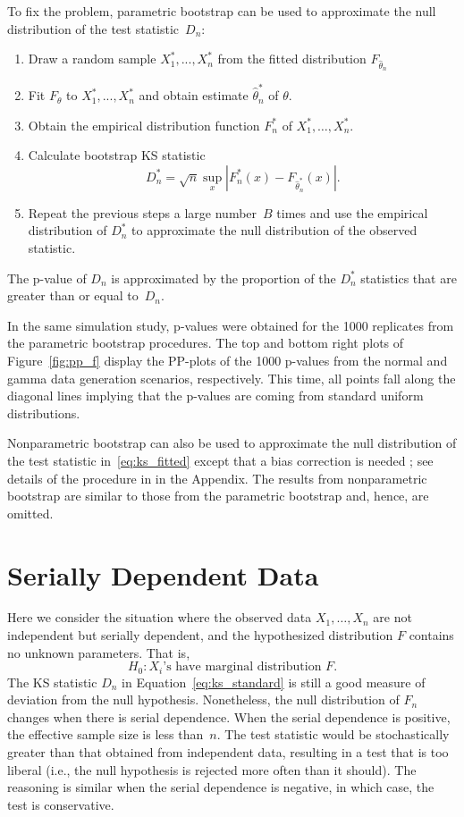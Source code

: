 \documentclass[12pt, letterpaper, titlepage]{article}
\begin{document}
To fix the problem, parametric bootstrap can be used to approximate the null
distribution of the test statistic~$D_n$:
\begin{enumerate}
\item
  Draw a random sample $X_1^*,...,X_n^*$ from the fitted distribution
  $F_{\hat\theta_n}$
\item
  Fit $F_\theta$ to $X_1^*,...,X_n^*$ and obtain estimate 
	$\hat\theta_n^*$ of $\theta$.
\item
  Obtain the empirical distribution function $F_n^*$ of
  $X_1^*, \ldots,  X_n^*$.
\item
  Calculate bootstrap KS statistic
  \[
    D_n^* = \sqrt{n} \sup_x | F_n^* (x)- F_{\hat\theta_n^*}(x) |.
  \]
\item
  Repeat the previous steps a large number~$B$ times and use the empirical
  distribution of $D_n^*$ to approximate the null distribution of the observed
  statistic.
\end{enumerate}
The p-value of $D_n$ is approximated by the proportion of the $D_n^*$ 
statistics that are greater than or equal to~$D_n$.


In the same simulation study, p-values were obtained for the 1000 replicates
from the parametric bootstrap procedures. The top and bottom right plots of 
Figure~\ref{fig:pp_f} display the PP-plots of the 1000
p-values from the normal and gamma data generation scenarios,
respectively. This time, all points fall along the diagonal lines implying that
the p-values are coming from standard uniform distributions.


Nonparametric bootstrap can also be used to approximate the null distribution
of the test statistic in~\eqref{eq:ks_fitted} except that a bias correction is 
needed \citep{babu2004goodness}; see details of the procedure in
in the Appendix. The results from nonparametric bootstrap are similar to those
from the parametric bootstrap and, hence, are omitted.




\section{Serially Dependent Data}
\label{sec:dependence}

Here we consider the situation where the observed data $X_1, \ldots, X_n$ are
not independent but serially dependent, and the hypothesized distribution $F$
contains no unknown parameters. That is,
\[
H_0: \text{$X_i$'s have marginal distribution $F$.}
\]
The KS statistic $D_n$ in Equation~\eqref{eq:ks_standard}
is still a good measure of deviation from the null hypothesis. Nonetheless, the
null distribution of $F_n$ changes when there is serial dependence.
When the serial dependence is
positive, the effective sample size is less than~$n$. The test statistic
would be stochastically greater than that obtained from independent data, 
resulting in a test that is too liberal (i.e., the null hypothesis is rejected
more often than it should). The reasoning is similar when the serial dependence 
is negative, in which case, the test is conservative.
\end{document}
